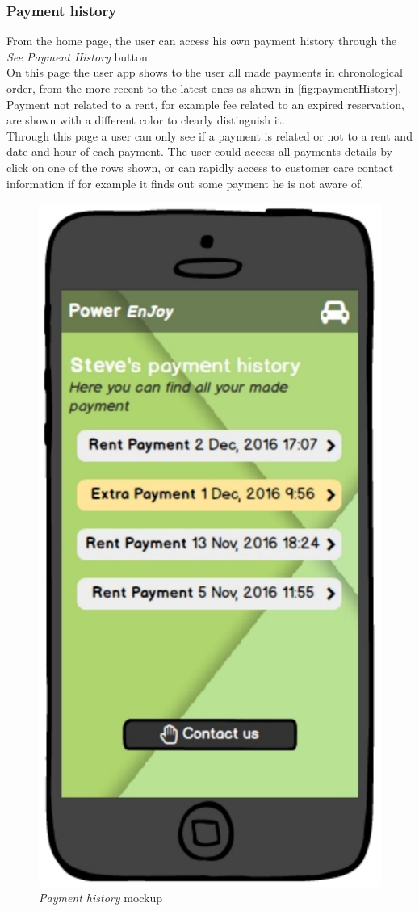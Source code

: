 \subsubsection{Payment history}

From the home page, the user can access his own payment history through the \emph{See Payment History} button. \\

On this page the user app shows to the user all made payments in chronological order, from the more recent to the latest ones as shown in \autoref{fig:paymentHistory}. \\

Payment not related to a rent, for example fee related to an expired reservation, are shown with a different color to clearly distinguish it. \\

Through this page a user can only see if a payment is related or not to a rent and date and hour of each payment. The user could access all payments details by click on one of the rows shown, or can rapidly access to customer care contact information if for example it finds out some payment he is not aware of. \\


\begin{figure}[h]
			\centering
			\includegraphics[width=0.4\linewidth]{mockups/paymentHistory}
			\caption{
				\label{fig:paymentHistory} 
				\emph{Payment history} mockup
			}
		\end{figure}
\clearpage

